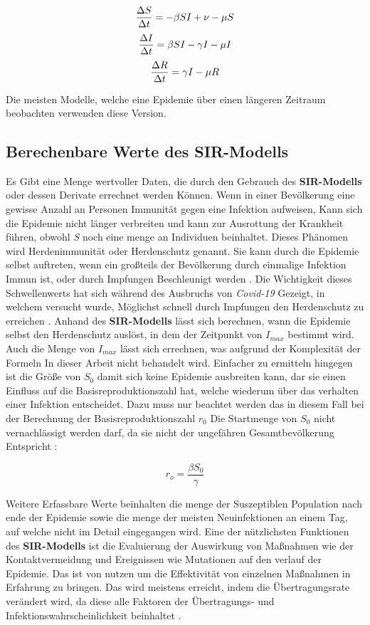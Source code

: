 \documentclass[12pt]{scrartcl} %
\begin{document}
$$ \frac{\Delta S}{\Delta t} = -\beta\space S I + \nu - \mu S $$
$$ \frac{\Delta I}{\Delta t} = \beta\space S I -\gamma\space I - \mu I $$
$$ \frac{\Delta R}{\Delta t} = \gamma\space I - \mu R $$

Die meisten Modelle, welche eine Epidemie über einen längeren Zeitraum beobachten verwenden diese Version.


\subsection{Berechenbare Werte des SIR-Modells}

Es Gibt eine Menge wertvoller Daten, die durch den Gebrauch des \textbf{SIR-Modells} oder dessen Derivate errechnet werden Können.
Wenn in einer Bevölkerung eine gewisse Anzahl an Personen Immunität gegen eine Infektion aufweisen, Kann sich die Epidemie nicht länger verbreiten und kann zur Ausrottung der Krankheit führen, obwohl \textsl{S} noch eine menge an Individuen beinhaltet. Dieses Phänomen wird Herdenimmunität oder Herdenschutz genannt. Sie kann durch die Epidemie selbst auftreten, wenn ein großteils der Bevölkerung durch einmalige Infektion Immun ist, oder durch Impfungen Beschleunigt werden \cite{3}. Die Wichtigkeit dieses Schwellenwerts hat sich während des Ausbruchs von \textsl{Covid-19} Gezeigt, in welchem versucht wurde, Möglichst schnell durch Impfungen den Herdenschutz zu erreichen \cite{10}. Anhand des \textbf{SIR-Modells} lässt sich berechnen, wann die Epidemie selbst den Herdenschutz auslöst, in dem der Zeitpunkt von $ \textit{I}_{max} $ bestimmt wird. Auch die Menge von $ \textit{I}_{max} $ lässt sich errechnen, was aufgrund der Komplexität der Formeln In dieser Arbeit nicht behandelt wird. Einfacher zu ermitteln hingegen ist die Größe von $ \textit{S}_{0} $ damit sich keine Epidemie ausbreiten kann, dar sie einen Einfluss auf die Basisreproduktionszahl hat, welche wiederum über das verhalten einer Infektion entscheidet. 
Dazu muss nur beachtet werden das in diesem Fall bei der Berechnung der Basisreproduktionszahl $\textit{r}_{0} $ Die Startmenge von $ \textit{S}_{0}$ nicht vernachlässigt werden darf, da sie nicht der ungefähren Gesamtbevölkerung Entspricht \cite{7, 10}:

$$ r_{o} = \frac{\beta S_{0}}{\gamma} $$

Weitere Erfassbare Werte beinhalten die menge der Suszeptiblen Population nach ende der Epidemie sowie die menge der meisten Neuinfektionen an einem Tag, auf welche nicht im Detail eingegangen wird. Eine der nützlichsten Funktionen des \textbf{SIR-Modells} ist die Evaluierung der Auswirkung von Maßnahmen wie der Kontaktvermeidung und Ereignissen wie Mutationen auf den verlauf der Epidemie. Das ist von nutzen um die Effektivität von einzelnen Maßnahmen in Erfahrung zu bringen. Das wird meistens erreicht, indem die Übertragungsrate \textbeta\space verändert wird, da diese alle Faktoren der Übertragungs- und Infektionswahrscheinlichkeit beinhaltet \cite{8, 6, 9}.
\end{document}
